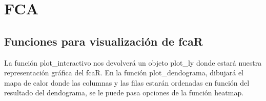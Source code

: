 \documentclass[
]{book}
\begin{document}
\hypertarget{fca}{%
\chapter{FCA}\label{fca}}

\hypertarget{funciones-para-visualizaciuxf3n-de-fcar}{%
\section{Funciones para visualización de fcaR}\label{funciones-para-visualizaciuxf3n-de-fcar}}

La función plot\_interactivo nos devolverá un objeto plot\_ly donde estará nuestra representación gráfica del fcaR.
En la función plot\_dendograma, dibujará el mapa de calor donde las columnas y las filas estarán ordenadas en función del resultado del dendograma, se le puede pasa opciones de la función heatmap.
\end{document}
